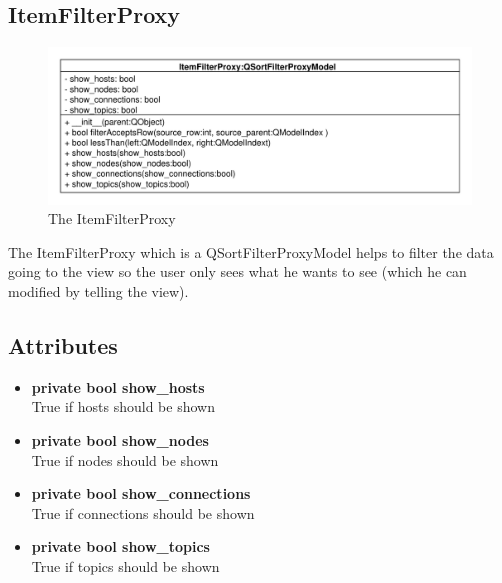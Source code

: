 \subsection{ItemFilterProxy}
\begin{figure}[htbp]
	\begin{minipage}[t]{7cm}
		\vspace{0pt}
		\centering
		\includegraphics[scale=0.6]{./diagram_pictures/ItemFilter.pdf}
		\caption{The ItemFilterProxy}
	\end{minipage}
\end{figure} 
The ItemFilterProxy which is a QSortFilterProxyModel helps to filter the data going to the view so the user only sees what he wants to see (which he can modified by telling the view). 
\subsection{Attributes}
\begin{itemize}
  \item \textbf{private bool show\_hosts}\\
  True if hosts should be shown
  \item \textbf{private bool show\_nodes}\\
  True if nodes should be shown
  \item \textbf{private bool show\_connections}\\
  True if connections should be shown
  \item \textbf{private bool show\_topics}\\
  True if topics should be shown
\end{itemize}
